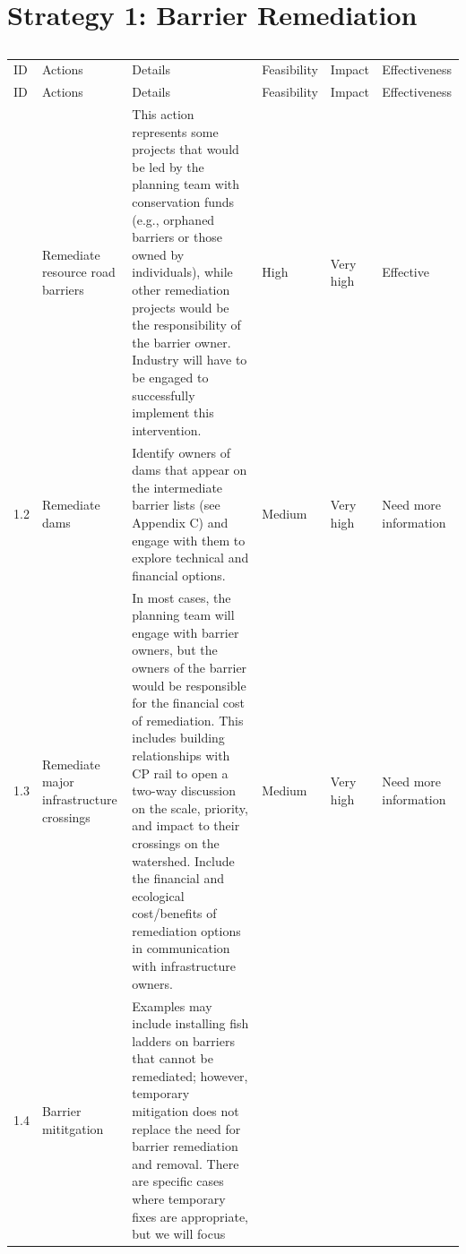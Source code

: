 \documentclass[
  letterpaper,
  DIV=11,
  numbers=noendperiod]{scrreprt}
\begin{document}
\section*{Strategy 1: Barrier
Remediation}\label{strategy-1-barrier-remediation}


\begin{longtable}[]{@{}llllll@{}}

\caption{\label{tbl-S1}Strategy 1}

\tabularnewline

\caption{}\label{T_b001d}\tabularnewline
\toprule\noalign{}
ID & Actions & Details & Feasibility & Impact & Effectiveness \\
\midrule\noalign{}
\endfirsthead
\toprule\noalign{}
ID & Actions & Details & Feasibility & Impact & Effectiveness \\
\midrule\noalign{}
\endhead
\bottomrule\noalign{}
\endlastfoot
1.1 & Remediate resource road barriers & This action represents some
projects that would be led by the planning team with conservation funds
(e.g., orphaned barriers or those owned by individuals), while other
remediation projects would be the responsibility of the barrier owner.
Industry will have to be engaged to successfully implement this
intervention. & High & Very high & Effective \\
1.2 & Remediate dams & Identify owners of dams that appear on the
intermediate barrier lists (see Appendix C) and engage with them to
explore technical and financial options. & Medium & Very high & Need
more information \\
1.3 & Remediate major infrastructure crossings & In most cases, the
planning team will engage with barrier owners, but the owners of the
barrier would be responsible for the financial cost of remediation. This
includes building relationships with CP rail to open a two-way
discussion on the scale, priority, and impact to their crossings on the
watershed. Include the financial and ecological cost/benefits of
remediation options in communication with infrastructure owners. &
Medium & Very high & Need more information \\
1.4 & Barrier mititgation & Examples may include installing fish ladders
on barriers that cannot be remediated; however, temporary mitigation
does not replace the need for barrier remediation and removal. There are
specific cases where temporary fixes are appropriate, but we will focus

\end{longtable}
\end{document}

